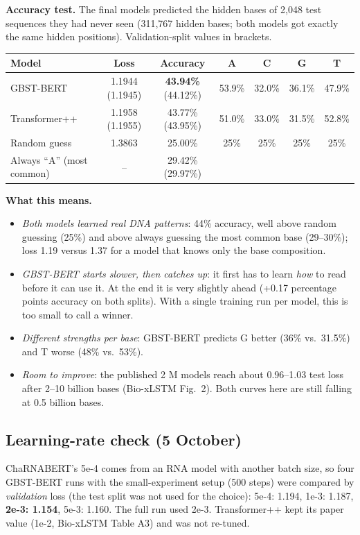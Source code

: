 \documentclass[11pt,a4paper]{article}
\begin{document}
\textbf{Accuracy test.} The final models predicted the hidden bases of 2,048 test sequences they
had never seen (311,767 hidden bases; both models got exactly the same hidden positions).
Validation-split values in brackets.

\begin{center}\small\setlength{\tabcolsep}{4pt}
\begin{tabular}{lcccccc}
\toprule
Model & Loss & Accuracy & A & C & G & T \\
\midrule
GBST-BERT & 1.1944 (1.1945) & \textbf{43.94\%} (44.12\%) & 53.9\% & 32.0\% & 36.1\% & 47.9\% \\
Transformer++ & 1.1958 (1.1955) & 43.77\% (43.95\%) & 51.0\% & 33.0\% & 31.5\% & 52.8\% \\
Random guess & 1.3863 & 25.00\% & 25\% & 25\% & 25\% & 25\% \\
Always ``A'' (most common) & -- & 29.42\% (29.97\%) & & & & \\
\bottomrule
\end{tabular}
\end{center}

\textbf{What this means.}
\begin{itemize}
\item \emph{Both models learned real DNA patterns}: 44\% accuracy, well above random guessing
  (25\%) and above always guessing the most common base (29--30\%); loss 1.19 versus 1.37 for a
  model that knows only the base composition.
\item \emph{GBST-BERT starts slower, then catches up}: it first has to learn \emph{how} to read
  before it can use it. At the end it is very slightly ahead (+0.17 percentage points accuracy on
  both splits). With a single training run per model, this is too small to call a winner.
\item \emph{Different strengths per base}: GBST-BERT predicts G better (36\% vs.\ 31.5\%) and T
  worse (48\% vs.\ 53\%).
\item \emph{Room to improve}: the published 2 M models reach about 0.96--1.03 test loss after
  2--10 billion bases (Bio-xLSTM Fig.~2). Both curves here are still falling at 0.5 billion bases.
\end{itemize}

\subsection*{Learning-rate check (5 October)}
ChaRNABERT's 5e-4 comes from an RNA model with another batch size, so four GBST-BERT runs with the
small-experiment setup (500 steps) were compared by \emph{validation} loss (the test split was not
used for the choice): 5e-4: 1.194, 1e-3: 1.187, \textbf{2e-3: 1.154}, 5e-3: 1.160. The full run
used 2e-3. Transformer++ kept its paper value (1e-2, Bio-xLSTM Table A3) and was not re-tuned.
\end{document}
